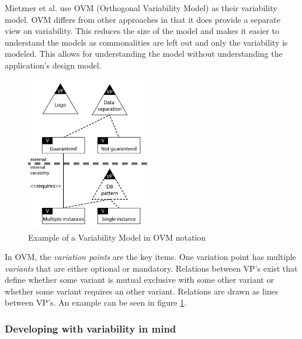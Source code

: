 Mietzner et al. \cite{mietzner2009variability} use OVM (Orthogonal Variability Model) as their variability model. OVM differs from other approaches in that it does provide a separate view on variability. This reduces the size of the model and makes it easier to understand the models as commonalities are left out and only the variability is modeled. This allows for understanding the model without understanding the application's design model.

\begin{figure}[htr]
    \centering
    \includegraphics[width=0.48\textwidth]{assets/OVM}
    \caption{Example of a Variability Model in OVM notation}
    \label{fig:ovm}
\end{figure}

In OVM, the \textit{variation points} are the key items. One variation point has multiple \textit{variants} that are either optional or mandatory. Relations between VP's exist that define whether some variant is mutual exclusive with some other variant or whether some variant requires an other variant. Relations are drawn as lines between VP's. An example can be seen in figure \ref{fig:ovm}.

\subsubsection{Developing with variability in mind}

